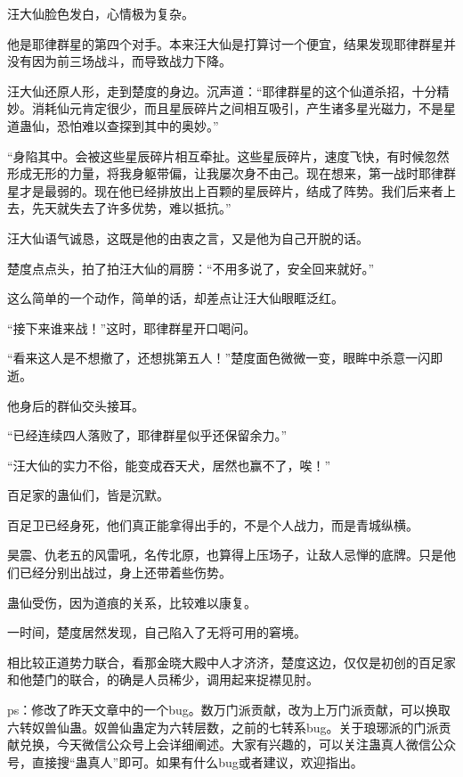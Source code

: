 \begin{this_body}
汪大仙脸色发白，心情极为复杂。

他是耶律群星的第四个对手。本来汪大仙是打算讨一个便宜，结果发现耶律群星并没有因为前三场战斗，而导致战力下降。

汪大仙还原人形，走到楚度的身边。沉声道：“耶律群星的这个仙道杀招，十分精妙。消耗仙元肯定很少，而且星辰碎片之间相互吸引，产生诸多星光磁力，不是星道蛊仙，恐怕难以查探到其中的奥妙。”

“身陷其中。会被这些星辰碎片相互牵扯。这些星辰碎片，速度飞快，有时候忽然形成无形的力量，将我身躯带偏，让我屡次身不由己。现在想来，第一战时耶律群星才是最弱的。现在他已经排放出上百颗的星辰碎片，结成了阵势。我们后来者上去，先天就失去了许多优势，难以抵抗。”

汪大仙语气诚恳，这既是他的由衷之言，又是他为自己开脱的话。

楚度点点头，拍了拍汪大仙的肩膀：“不用多说了，安全回来就好。”

这么简单的一个动作，简单的话，却差点让汪大仙眼眶泛红。

“接下来谁来战！”这时，耶律群星开口喝问。

“看来这人是不想撤了，还想挑第五人！”楚度面色微微一变，眼眸中杀意一闪即逝。

他身后的群仙交头接耳。

“已经连续四人落败了，耶律群星似乎还保留余力。”

“汪大仙的实力不俗，能变成吞天犬，居然也赢不了，唉！”

百足家的蛊仙们，皆是沉默。

百足卫已经身死，他们真正能拿得出手的，不是个人战力，而是青城纵横。

昊震、仇老五的风雷吼，名传北原，也算得上压场子，让敌人忌惮的底牌。只是他们已经分别出战过，身上还带着些伤势。

蛊仙受伤，因为道痕的关系，比较难以康复。

一时间，楚度居然发现，自己陷入了无将可用的窘境。

相比较正道势力联合，看那金晓大殿中人才济济，楚度这边，仅仅是初创的百足家和他楚门的联合，的确是人员稀少，调用起来捉襟见肘。

ps：修改了昨天文章中的一个bug。数万门派贡献，改为上万门派贡献，可以换取六转奴兽仙蛊。奴兽仙蛊定为六转层数，之前的七转系bug。关于琅琊派的门派贡献兑换，今天微信公众号上会详细阐述。大家有兴趣的，可以关注蛊真人微信公众号，直接搜“蛊真人”即可。如果有什么bug或者建议，欢迎指出。

\end{this_body}

